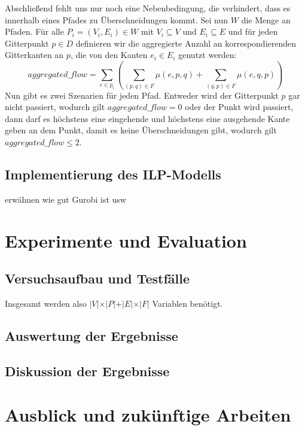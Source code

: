 \documentclass[bachelor, german]{algothesis}
\begin{document}
Abschließend fehlt uns nur noch eine Nebenbedingung, die verhindert, dass es innerhalb eines Pfades zu Überschneidungen kommt. Sei nun $W$ die Menge an Pfaden. Für alle $P_i =(V_i, E_i) \in W$  mit $V_i\subseteq V$ und  $E_i \subseteq E$ und für jeden Gitterpunkt $p \in D$ definieren wir die aggregierte Anzahl an korrespondierenden Gitterkanten an $p$, die von den Kanten $e_i \in E_i$ genutzt werden: $$aggregated\_flow = \sum_{e \in p_i}(\sum_{(p,q) \in F} \mu(e,p,q) + \sum_{(q,p) \in F} \mu(e,q,p))$$  Nun gibt es zwei Szenarien für jeden Pfad. Entweder wird der Gitterpunkt $p$ gar nicht passiert, wodurch gilt $aggregated\_flow = 0$ oder der Punkt wird passiert, dann darf es höchstens eine eingehende und höchstens eine ausgehende Kante geben an dem Punkt, damit es keine Überschneidungen gibt, wodurch gilt $aggregated\_flow \leq 2$.\newline 


\section{Implementierung des ILP-Modells}
\cite{Gurobi} erwähnen wie gut Gurobi ist usw

\chapter{Experimente und Evaluation}
\section{Versuchsaufbau und Testfälle}
Insgesamt werden also $\vert V\vert \times \vert P\vert + \vert E \vert \times \vert F\vert$ Variablen benötigt. 
\section{Auswertung der Ergebnisse}
\section{Diskussion der Ergebnisse}

\chapter{Ausblick und zukünftige Arbeiten}
\clearpage


\end{document}
